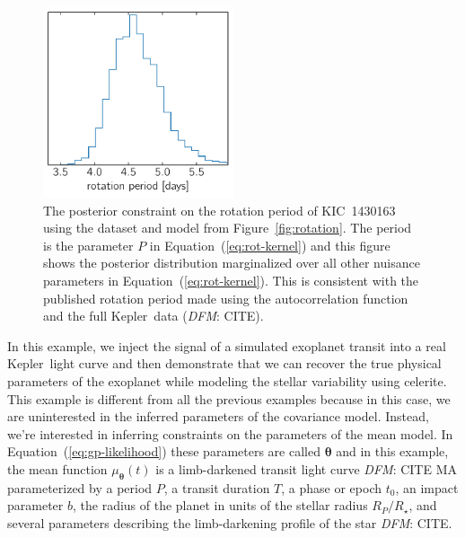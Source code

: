 \documentclass[manuscript, letterpaper]{aastex6}
\makeatletter
\let\origsubsection\subsection
\renewcommand\subsection{\@ifstar{\starsubsection}{\nostarsubsection}}
\newcommand\nostarsubsection[1]{\subsectionprelude\origsubsection{#1}}
\newcommand\starsubsection[1]{\subsectionprelude\origsubsection*{#1}}
\newcommand\subsectionprelude{\vspace{1em}}
\newcommand{\project}[1]{\textsf{#1}}
\newcommand{\kepler}{\project{Kepler}}
\newcommand{\celerite}{\project{celerite}}
\newcommand{\figureref}[1]{\ref{fig:#1}}
\newcommand{\Figure}[1]{Figure~\figureref{#1}}
\newcommand{\figurelabel}[1]{\label{fig:#1}}
\renewcommand{\eqref}[1]{\ref{eq:#1}}
\newcommand{\Eq}[1]{Equation~(\eqref{#1})}
\newcommand{\eq}[1]{\Eq{#1}}
\newcommand{\bvec}[1]{{\ensuremath{\boldsymbol{#1}}}}
\newcommand{\todo}[3]{{\color{#2}\emph{#1}: #3}}
\newcommand{\dfmtodo}[1]{\todo{DFM}{red}{#1}}
\makeatother
\begin{document}
\begin{figure}[!htbp]
\begin{center}
\includegraphics[width=0.5\textwidth]{figures/rotation-period.pdf}
\caption{The posterior constraint on the rotation period of KIC~1430163 using
    the dataset and model from \Figure{rotation}.
    The period is the parameter $P$ in \eq{rot-kernel} and this figure shows
    the posterior distribution marginalized over all other nuisance parameters
    in \eq{rot-kernel}.
    This is consistent with the published rotation period made using the
    autocorrelation function and the full \kepler\ data (\dfmtodo{CITE}).
    \figurelabel{rotation-period}}
\end{center}
\end{figure}

\subsection{Exoplanet transit fitting}

In this example, we inject the signal of a simulated exoplanet transit into a
real \kepler\ light curve and then demonstrate that we can recover the true
physical parameters of the exoplanet while modeling the stellar variability
using \celerite.
This example is different from all the previous examples because in this case,
we are uninterested in the inferred parameters of the covariance model.
Instead, we're interested in inferring constraints on the parameters of the
mean model.
In \eq{gp-likelihood} these parameters are called $\bvec{\theta}$ and in this
example, the mean function $\mu_\bvec{\theta}(t)$ is a limb-darkened transit
light curve \dfmtodo{CITE MA} parameterized by a period $P$, a transit
duration $T$, a phase or epoch $t_0$, an impact parameter $b$, the radius
of the planet in units of the stellar radius $R_P/R_\star$, and several
parameters describing the limb-darkening profile of the star \dfmtodo{CITE}.
\end{document}
